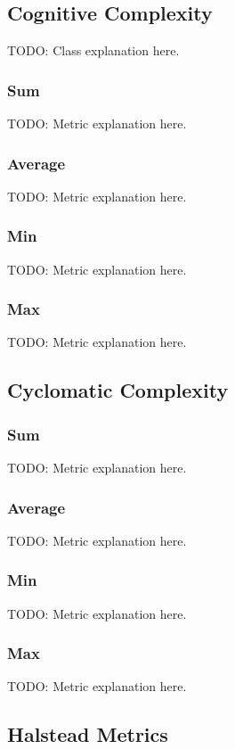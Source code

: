 \subsection{Cognitive Complexity}
TODO: Class explanation here.

\subsubsection{Sum}
TODO: Metric explanation here.

\subsubsection{Average}
TODO: Metric explanation here.

\subsubsection{Min}
TODO: Metric explanation here.

\subsubsection{Max}
TODO: Metric explanation here.

\subsection{Cyclomatic Complexity}

\subsubsection{Sum}
TODO: Metric explanation here.

\subsubsection{Average}
TODO: Metric explanation here.

\subsubsection{Min}
TODO: Metric explanation here.

\subsubsection{Max}
TODO: Metric explanation here.

\subsection{Halstead Metrics}

